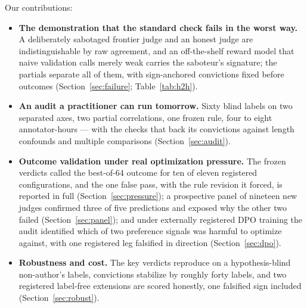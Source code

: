 \documentclass[11pt]{article}
\begin{document}
Our contributions:
\begin{itemize}
\item \textbf{The demonstration that the standard check fails in the worst way.} A deliberately sabotaged frontier judge and an honest judge are indistinguishable by raw agreement, and an off-the-shelf reward model that naive validation calls merely weak carries the saboteur's signature; the partials separate all of them, with sign-anchored convictions fixed before outcomes (Section~\ref{sec:failure}; Table~\ref{tab:h2h}).
\item \textbf{An audit a practitioner can run tomorrow.} Sixty blind labels on two separated axes, two partial correlations, one frozen rule, four to eight annotator-hours --- with the checks that back its convictions against length confounds and multiple comparisons (Section~\ref{sec:audit}).
\item \textbf{Outcome validation under real optimization pressure.} The frozen verdicts called the best-of-64 outcome for ten of eleven registered configurations, and the one false pass, with the rule revision it forced, is reported in full (Section~\ref{sec:pressure}); a prospective panel of nineteen new judges confirmed three of five predictions and exposed why the other two failed (Section~\ref{sec:panel}); and under externally registered DPO training the audit identified which of two preference signals was harmful to optimize against, with one registered leg falsified in direction (Section~\ref{sec:dpo}).
\item \textbf{Robustness and cost.} The key verdicts reproduce on a hypothesis-blind non-author's labels, convictions stabilize by roughly forty labels, and two registered label-free extensions are scored honestly, one falsified sign included (Section~\ref{sec:robust}).
\end{itemize}
\end{document}
